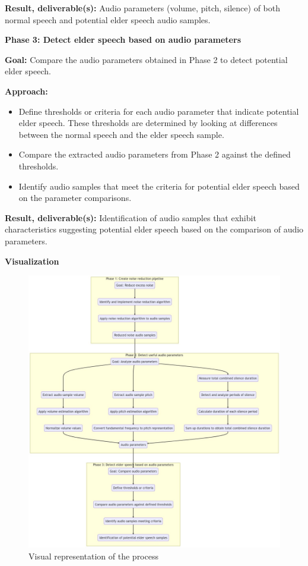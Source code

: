 \documentclass[english]{hogent-article}
\begin{document}
\textbf{Result, deliverable(s):} Audio parameters (volume, pitch, silence) of both normal speech and potential elder speech audio samples.

\textbf{Phase 3: Detect elder speech based on audio parameters}

\textbf{Goal:} Compare the audio parameters obtained in Phase 2 to detect potential elder speech.

\textbf{Approach:}
\begin{itemize}
    \item Define thresholds or criteria for each audio parameter that indicate potential elder speech. These thresholds are determined by looking at differences between the normal speech and the elder speech sample.
    \item Compare the extracted audio parameters from Phase 2 against the defined thresholds.
    \item Identify audio samples that meet the criteria for potential elder speech based on the parameter comparisons.
\end{itemize}

\textbf{Result, deliverable(s):} Identification of audio samples that exhibit characteristics suggesting potential elder speech based on the comparison of audio parameters.

\textbf{Visualization}

\begin{figure}[ht]
    \centering
    \includegraphics[width=\linewidth]{img/actionplan.png}
    \caption{Visual representation of the process}
\end{figure}
\end{document}
